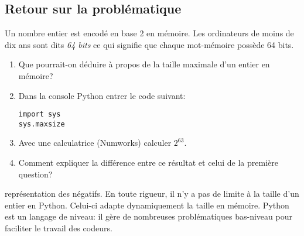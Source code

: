 \documentclass[a4paper,11pt]{article}
\begin{document}
\begin{Form}
\section{Retour sur la problématique}
Un nombre entier est encodé en base 2 en mémoire. Les ordinateurs de moins de dix ans sont dits \emph{64 bits} ce qui signifie que chaque mot-mémoire possède 64 bits.
\begin{activite}
\begin{enumerate}
\item Que pourrait-on déduire à propos de la taille maximale d'un entier en mémoire?
\item Dans la console Python entrer le code suivant:
\begin{lstlisting}
import sys
sys.maxsize
\end{lstlisting}
\item Avec une calculatrice (Numworks) calculer $2^{63}$.
\item Comment expliquer la différence entre ce résultat et celui de la première question?
\end{enumerate}
\end{activite}
\begin{commentprof}
représentation des négatifs. En toute rigueur, il n'y a pas de limite à la taille d'un entier en Python. Celui-ci adapte dynamiquement la taille en mémoire. Python est un langage de niveau: il gère de nombreuses problématiques bas-niveau pour faciliter le travail des codeurs.
\end{commentprof}
\end{Form}
\end{document}
